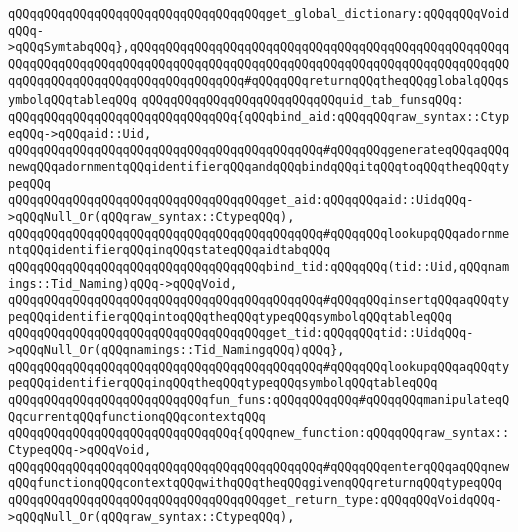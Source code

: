 \verb|qQQqqQQqqQQqqQQqqQQqqQQqqQQqqQQqqQQqget_global_dictionary:qQQqqQQqVoidqQQq->qQQqSymtabqQQq},qQQqqQQqqQQqqQQqqQQqqQQqqQQqqQQqqQQqqQQqqQQqqQQqqQQqqQQqqQQqqQQqqQQqqQQqqQQqqQQqqQQqqQQqqQQqqQQqqQQqqQQqqQQqqQQqqQQqqQQqqQQqqQQqqQQqqQQqqQQqqQQqqQQqqQQqqQQq#qQQqqQQqreturnqQQqtheqQQqglobalqQQqsymbolqQQqtableqQQq|\newline
\newline
\verb|qQQqqQQqqQQqqQQqqQQqqQQqqQQquid_tab_funsqQQq:|\newline
\verb|qQQqqQQqqQQqqQQqqQQqqQQqqQQqqQQq{qQQqbind_aid:qQQqqQQqraw_syntax::CtypeqQQq->qQQqaid::Uid,|\newline
\verb|qQQqqQQqqQQqqQQqqQQqqQQqqQQqqQQqqQQqqQQqqQQq#qQQqqQQqgenerateqQQqaqQQqnewqQQqadornmentqQQqidentifierqQQqandqQQqbindqQQqitqQQqtoqQQqtheqQQqtypeqQQq|\newline
\verb|qQQqqQQqqQQqqQQqqQQqqQQqqQQqqQQqqQQqget_aid:qQQqqQQqaid::UidqQQq->qQQqNull_Or(qQQqraw_syntax::CtypeqQQq),|\newline
\verb|qQQqqQQqqQQqqQQqqQQqqQQqqQQqqQQqqQQqqQQqqQQq#qQQqqQQqlookupqQQqadornmentqQQqidentifierqQQqinqQQqstateqQQqaidtabqQQq|\newline
\verb|qQQqqQQqqQQqqQQqqQQqqQQqqQQqqQQqqQQqbind_tid:qQQqqQQq(tid::Uid,qQQqnamings::Tid_Naming)qQQq->qQQqVoid,|\newline
\verb|qQQqqQQqqQQqqQQqqQQqqQQqqQQqqQQqqQQqqQQqqQQq#qQQqqQQqinsertqQQqaqQQqtypeqQQqidentifierqQQqintoqQQqtheqQQqtypeqQQqsymbolqQQqtableqQQq|\newline
\verb|qQQqqQQqqQQqqQQqqQQqqQQqqQQqqQQqqQQqget_tid:qQQqqQQqtid::UidqQQq->qQQqNull_Or(qQQqnamings::Tid_NamingqQQq)qQQq},|\newline
\verb|qQQqqQQqqQQqqQQqqQQqqQQqqQQqqQQqqQQqqQQqqQQq#qQQqqQQqlookupqQQqaqQQqtypeqQQqidentifierqQQqinqQQqtheqQQqtypeqQQqsymbolqQQqtableqQQq|\newline
\newline
\verb|qQQqqQQqqQQqqQQqqQQqqQQqqQQqfun_funs:qQQqqQQqqQQq#qQQqqQQqmanipulateqQQqcurrentqQQqfunctionqQQqcontextqQQq|\newline
\verb|qQQqqQQqqQQqqQQqqQQqqQQqqQQqqQQq{qQQqnew_function:qQQqqQQqraw_syntax::CtypeqQQq->qQQqVoid,|\newline
\verb|qQQqqQQqqQQqqQQqqQQqqQQqqQQqqQQqqQQqqQQqqQQq#qQQqqQQqenterqQQqaqQQqnewqQQqfunctionqQQqcontextqQQqwithqQQqtheqQQqgivenqQQqreturnqQQqtypeqQQq|\newline
\verb|qQQqqQQqqQQqqQQqqQQqqQQqqQQqqQQqqQQqget_return_type:qQQqqQQqVoidqQQq->qQQqNull_Or(qQQqraw_syntax::CtypeqQQq),|\newline
